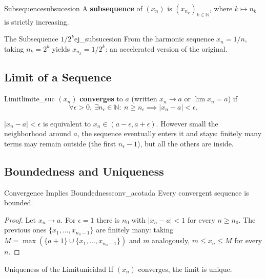 \documentclass[11pt, a4paper]{article}
\begin{document}
\begin{definicion}{Subsequence}{subsucesion}
A \textbf{subsequence} of $(x_n)$ is $(x_{n_k})_{k \in \mathbb{N}}$, where $k \mapsto n_k$ is
strictly increasing.
\end{definicion}

\begin{ejemplo}{The Subsequence $1/2^k$}{ej_subsucesion}
From the harmonic sequence $x_n = 1/n$, taking $n_k = 2^k$ yields $x_{n_k} = 1/2^k$: an accelerated version
of the original.
\end{ejemplo}

\subsection{Limit of a Sequence}

\begin{definicion}{Limit}{limite_suc}
$(x_n)$ \textbf{converges} to $a$ (written $x_n \to a$ or $\lim x_n = a$) if
$$ \forall \epsilon > 0, \ \exists n_\epsilon \in \mathbb{N} : \ n \ge n_\epsilon \implies |x_n - a|
< \epsilon. $$
\end{definicion}

$|x_n - a| < \epsilon$ is equivalent to $x_n \in (a - \epsilon, a + \epsilon)$. However small the
neighborhood around $a$, the sequence eventually enters it and stays: finitely many
terms may remain outside (the first $n_\epsilon - 1$), but all the others are inside.

\subsection{Boundedness and Uniqueness}

\begin{proposicion}{Convergence Implies Boundedness}{conv_acotada}
Every convergent sequence is bounded.
\end{proposicion}

\begin{proof}
Let $x_n \to a$. For $\epsilon = 1$ there is $n_0$ with $|x_n - a| < 1$ for every $n \ge n_0$. The
previous ones $\{x_1, \dots, x_{n_0-1}\}$ are finitely many: taking
$M = \max(\{a+1\} \cup \{x_1, \dots, x_{n_0-1}\})$ and $m$ analogously, $m \le x_n \le M$ for every $n$.
\end{proof}

\begin{proposicion}{Uniqueness of the Limit}{unicidad}
If $(x_n)$ converges, the limit is unique.
\end{proposicion}
\end{document}
